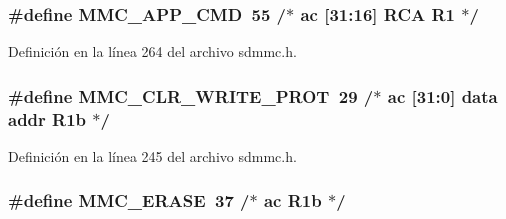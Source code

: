 \subsubsection[{\texorpdfstring{M\+M\+C\+\_\+\+A\+P\+P\+\_\+\+C\+MD}{MMC_APP_CMD}}]{\setlength{\rightskip}{0pt plus 5cm}\#define M\+M\+C\+\_\+\+A\+P\+P\+\_\+\+C\+MD~55		/$\ast$ ac   \mbox{[}31\+:16\mbox{]} R\+CA        R1  $\ast$/}\hypertarget{group___c_h_i_p___s_d_m_m_c___definitions_ga1c95b693152459b6689d0103b74faa67}{}\label{group___c_h_i_p___s_d_m_m_c___definitions_ga1c95b693152459b6689d0103b74faa67}


Definición en la línea 264 del archivo sdmmc.\+h.

\subsubsection[{\texorpdfstring{M\+M\+C\+\_\+\+C\+L\+R\+\_\+\+W\+R\+I\+T\+E\+\_\+\+P\+R\+OT}{MMC_CLR_WRITE_PROT}}]{\setlength{\rightskip}{0pt plus 5cm}\#define M\+M\+C\+\_\+\+C\+L\+R\+\_\+\+W\+R\+I\+T\+E\+\_\+\+P\+R\+OT~29		/$\ast$ ac   \mbox{[}31\+:0\mbox{]}  data addr  R1b $\ast$/}\hypertarget{group___c_h_i_p___s_d_m_m_c___definitions_ga5f032981b1a6e146e7a8b5dd9e6a38b2}{}\label{group___c_h_i_p___s_d_m_m_c___definitions_ga5f032981b1a6e146e7a8b5dd9e6a38b2}


Definición en la línea 245 del archivo sdmmc.\+h.

\subsubsection[{\texorpdfstring{M\+M\+C\+\_\+\+E\+R\+A\+SE}{MMC_ERASE}}]{\setlength{\rightskip}{0pt plus 5cm}\#define M\+M\+C\+\_\+\+E\+R\+A\+SE~37		/$\ast$ ac                      R1b $\ast$/}\hypertarget{group___c_h_i_p___s_d_m_m_c___definitions_ga4e5a18015a01bc99ea6af998a2d71728}{}\label{group___c_h_i_p___s_d_m_m_c___definitions_ga4e5a18015a01bc99ea6af998a2d71728}


